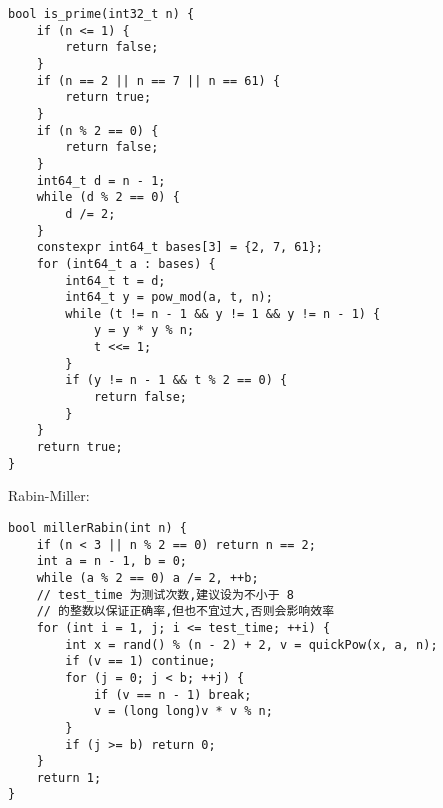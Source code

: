 \begin{lstlisting}
bool is_prime(int32_t n) {
	if (n <= 1) {
		return false;
	}
	if (n == 2 || n == 7 || n == 61) {
		return true;
	}
	if (n % 2 == 0) {
		return false;
	}
	int64_t d = n - 1;
	while (d % 2 == 0) {
		d /= 2;
	}
	constexpr int64_t bases[3] = {2, 7, 61};
	for (int64_t a : bases) {
		int64_t t = d;
		int64_t y = pow_mod(a, t, n);
		while (t != n - 1 && y != 1 && y != n - 1) {
			y = y * y % n;
			t <<= 1;
		}
		if (y != n - 1 && t % 2 == 0) {
			return false;
		}
	}
	return true;
}
\end{lstlisting}
Rabin-Miller:
\begin{lstlisting}
bool millerRabin(int n) {
	if (n < 3 || n % 2 == 0) return n == 2;
	int a = n - 1, b = 0;
	while (a % 2 == 0) a /= 2, ++b;
	// test_time 为测试次数,建议设为不小于 8
	// 的整数以保证正确率,但也不宜过大,否则会影响效率
	for (int i = 1, j; i <= test_time; ++i) {
		int x = rand() % (n - 2) + 2, v = quickPow(x, a, n);
		if (v == 1) continue;
		for (j = 0; j < b; ++j) {
			if (v == n - 1) break;
			v = (long long)v * v % n;
		}
		if (j >= b) return 0;
	}
	return 1;
}
\end{lstlisting}